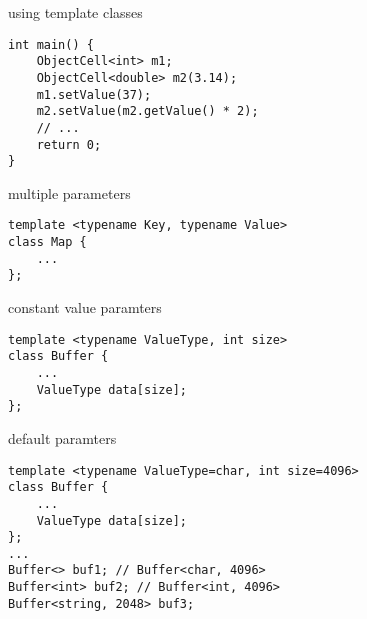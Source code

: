 \begin{frame}[fragile,label=useTempCl]{using template classes}
\begin{lstlisting}
int main() {
    ObjectCell<int> m1;
    ObjectCell<double> m2(3.14);
    m1.setValue(37);
    m2.setValue(m2.getValue() * 2);
    // ...
    return 0;
}
\end{lstlisting}
\end{frame}

\begin{frame}[fragile,label=multParam]{multiple parameters}
\begin{lstlisting}
template <typename Key, typename Value>
class Map {
    ...
};
\end{lstlisting}
\end{frame}

\begin{frame}[fragile,label=constValParam]{constant value paramters}
\begin{lstlisting}
template <typename ValueType, int size>
class Buffer {
    ...
    ValueType data[size];
};
\end{lstlisting}
\end{frame}

\begin{frame}[fragile,label=defParam]{default paramters}
\begin{lstlisting}
template <typename ValueType=char, int size=4096>
class Buffer {
    ...
    ValueType data[size];
};
...
Buffer<> buf1; // Buffer<char, 4096>
Buffer<int> buf2; // Buffer<int, 4096>
Buffer<string, 2048> buf3;
\end{lstlisting}
\end{frame}

